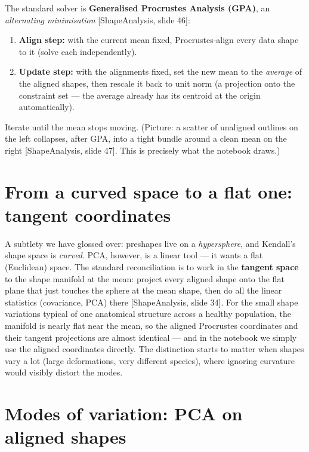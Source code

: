 \documentclass[11pt]{article}
\newcommand{\deck}[1]{\textsf{\small[#1]}}
\begin{document}
The standard solver is \textbf{Generalised Procrustes Analysis (GPA)}, an
\emph{alternating minimisation} \deck{ShapeAnalysis, slide 46}:
\begin{enumerate}[nosep,leftmargin=*]
  \item \textbf{Align step:} with the current mean fixed, Procrustes-align every
  data shape to it (solve each independently).
  \item \textbf{Update step:} with the alignments fixed, set the new mean to the
  \emph{average} of the aligned shapes, then rescale it back to unit norm
  (a projection onto the constraint set --- the average already has its centroid
  at the origin automatically).
\end{enumerate}
Iterate until the mean stops moving. (Picture: a scatter of unaligned outlines
on the left collapses, after GPA, into a tight bundle around a clean mean on the
right \deck{ShapeAnalysis, slide 47}. This is precisely what the notebook draws.)

\section{From a curved space to a flat one: tangent coordinates}

A subtlety we have glossed over: preshapes live on a \emph{hypersphere}, and
Kendall's shape space is \emph{curved}. PCA, however, is a linear tool --- it
wants a flat (Euclidean) space. The standard reconciliation is to work in the
\textbf{tangent space} to the shape manifold at the mean: project every aligned
shape onto the flat plane that just touches the sphere at the mean shape, then do
all the linear statistics (covariance, PCA) there \deck{ShapeAnalysis, slide 34}.
For the small shape variations typical of one anatomical structure across a
healthy population, the manifold is nearly flat near the mean, so the aligned
Procrustes coordinates and their tangent projections are almost identical --- and
in the notebook we simply use the aligned coordinates directly. The distinction
starts to matter when shapes vary a lot (large deformations, very different
species), where ignoring curvature would visibly distort the modes.

\section{Modes of variation: PCA on aligned shapes}
\end{document}
